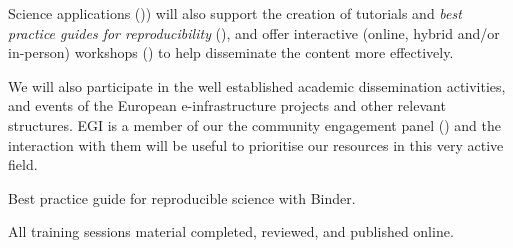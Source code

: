 \begin{workpackage}
\begin{wpdescription}
  Science applications ()) will also support the creation
   of tutorials and \emph{best practice guides for
    reproducibility} (), and
  offer interactive (online, hybrid and/or in-person) workshops () 
  to help disseminate the content more effectively.

  We will also participate in the well established academic dissemination
  activities, and events of the European e-infrastructure projects and other
  relevant structures. EGI is a member of our the community engagement panel
  () and the interaction with
  them will be useful to prioritise our resources in this very active field.
  
\end{wpdescription}

\begin{tasklist}



\end{tasklist}

\begin{wpdelivs}
  \begin{wpdeliv}[due=24,id=best-practice-guide,dissem=PU,miles=prototype,nature=R,lead=IFR]
  {Best practice guide for reproducible science with Binder.}
\end{wpdeliv}
\begin{wpdeliv}[due=36,id=education-materials2,dissem=PU,miles=final,nature=R,lead=IFR]
  {All training sessions material completed, reviewed, and published online.}
\end{wpdeliv}
\end{wpdelivs}

\end{workpackage}

